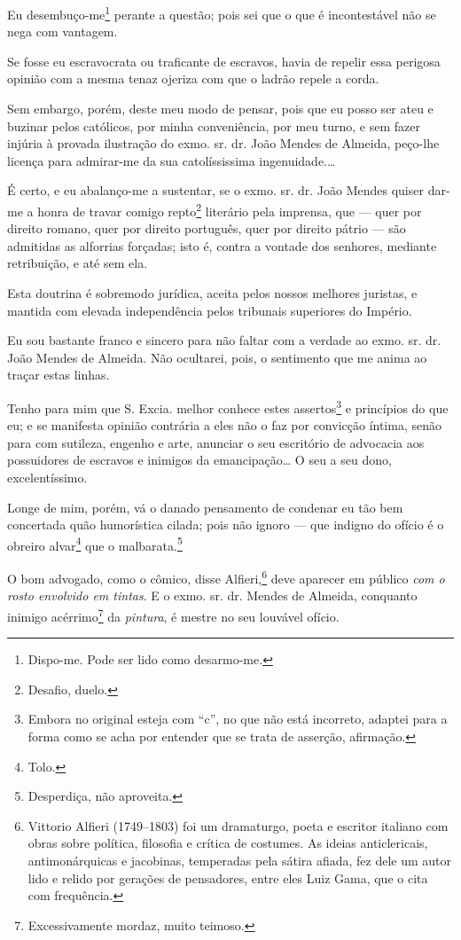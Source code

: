 Eu desembuço-me\footnote{ Dispo-me. Pode ser lido como desarmo-me.}
perante a questão; pois sei que o que é incontestável não se nega com
vantagem.

Se fosse eu escravocrata ou traficante de escravos, havia de repelir
essa perigosa opinião com a mesma tenaz ojeriza com que o ladrão repele
a corda.

Sem embargo, porém, deste meu modo de pensar, pois que eu posso ser ateu
e buzinar pelos católicos, por minha conveniência, por meu turno, e sem
fazer injúria à provada ilustração do exmo. sr. dr. João Mendes de
Almeida, peço-lhe licença para admirar-me da sua catolíssissima
ingenuidade.\ldots{}

É certo, e eu abalanço-me a sustentar, se o exmo. sr. dr. João Mendes
quiser dar-me a honra de travar comigo repto\footnote{ Desafio,
  duelo.} literário pela imprensa, que --- quer por direito romano, quer
por direito português, quer por direito pátrio --- são admitidas as
alforrias forçadas; isto é, contra a vontade dos senhores, mediante
retribuição, e até sem ela.

Esta doutrina é sobremodo jurídica, aceita pelos nossos melhores
juristas, e mantida com elevada independência pelos tribunais superiores
do Império.

Eu sou bastante franco e sincero para não faltar com a verdade ao exmo.
sr. dr. João Mendes de Almeida. Não ocultarei, pois, o sentimento que me
anima ao traçar estas linhas.

Tenho para mim que S. Excia. melhor conhece estes assertos\footnote{
  Embora no original esteja com ``c'', no que não está incorreto,
  adaptei para a forma como se acha por entender que se trata de
  asserção, afirmação.} e princípios do que eu; e se manifesta opinião
contrária a eles não o faz por convicção íntima, senão para com
sutileza, engenho e arte, anunciar o seu escritório de advocacia aos
possuidores de escravos e inimigos da emancipação\ldots{} O seu a seu dono,
excelentíssimo.

Longe de mim, porém, vá o danado pensamento de condenar eu tão bem
concertada quão humorística cilada; pois não ignoro --- que indigno do
ofício é o obreiro alvar\footnote{ Tolo.} que o
malbarata.\footnote{ Desperdiça, não aproveita.}

O bom advogado, como o cômico, disse
Alfieri,\footnote{ Vittorio Alfieri (1749--1803)
  foi um dramaturgo, poeta e escritor italiano com obras sobre política,
  filosofia e crítica de costumes. As ideias anticlericais,
  antimonárquicas e jacobinas, temperadas pela sátira afiada, fez dele
  um autor lido e relido por gerações de pensadores, entre eles Luiz
  Gama, que o cita com frequência.} deve aparecer em público \emph{com o
rosto envolvido em tintas}. E o exmo. sr. dr. Mendes de Almeida,
conquanto inimigo acérrimo\footnote{ Excessivamente mordaz, muito
  teimoso.} da \emph{pintura}, é mestre no seu louvável ofício.

